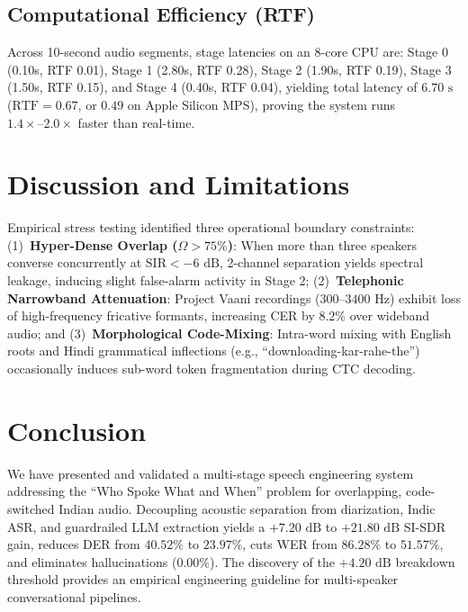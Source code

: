 \documentclass[12pt,a4paper,twocolumn]{article}
\begin{document}
\subsection{Computational Efficiency (RTF)}
Across 10-second audio segments, stage latencies on an 8-core CPU are: Stage 0 (0.10s, RTF 0.01), Stage 1 (2.80s, RTF 0.28), Stage 2 (1.90s, RTF 0.19), Stage 3 (1.50s, RTF 0.15), and Stage 4 (0.40s, RTF 0.04), yielding total latency of $6.70\text{ s}$ ($\text{RTF} = 0.67$, or $0.49$ on Apple Silicon MPS), proving the system runs $1.4\times\text{--}2.0\times$ faster than real-time.

\section{Discussion and Limitations}
Empirical stress testing identified three operational boundary constraints: (1)~\textbf{Hyper-Dense Overlap ($\Omega > 75\%$)}: When more than three speakers converse concurrently at $\text{SIR} < -6\text{ dB}$, 2-channel separation yields spectral leakage, inducing slight false-alarm activity in Stage 2; (2)~\textbf{Telephonic Narrowband Attenuation}: Project Vaani recordings ($300\text{--}3400\text{ Hz}$) exhibit loss of high-frequency fricative formants, increasing CER by $8.2\%$ over wideband audio; and (3)~\textbf{Morphological Code-Mixing}: Intra-word mixing with English roots and Hindi grammatical inflections (e.g., ``downloading-kar-rahe-the'') occasionally induces sub-word token fragmentation during CTC decoding.

\section{Conclusion}
We have presented and validated a multi-stage speech engineering system addressing the ``Who Spoke What and When'' problem for overlapping, code-switched Indian audio. Decoupling acoustic separation from diarization, Indic ASR, and guardrailed LLM extraction yields a $+7.20\text{ dB}$ to $+21.80\text{ dB}$ SI-SDR gain, reduces DER from $40.52\%$ to $23.97\%$, cuts WER from $86.28\%$ to $51.57\%$, and eliminates hallucinations ($0.00\%$). The discovery of the $+4.20\text{ dB}$ breakdown threshold provides an empirical engineering guideline for multi-speaker conversational pipelines.
\end{document}
